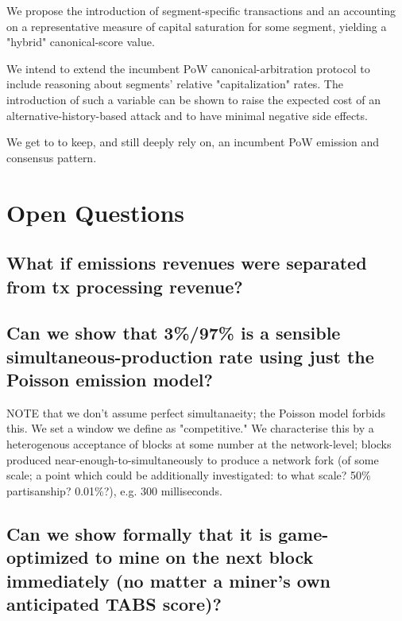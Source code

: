 \documentclass[11pt]{article}
\theoremstyle{plain}
\begin{document}
We propose the introduction of segment-specific transactions and an accounting
on a representative measure of capital saturation for some segment, yielding a
"hybrid" canonical-score value.

We intend to extend the incumbent PoW canonical-arbitration protocol to include
reasoning about segments' relative "capitalization" rates.
The introduction of such a variable can be shown to raise the expected cost of
an alternative-history-based attack and to have minimal negative side effects.

We get to to keep, and still deeply rely on, an incumbent PoW emission and
consensus pattern.





\section{\normalsize{Open Questions}}

\subsection{\small{What if emissions revenues were separated from tx processing
revenue?}}


\subsection{\small{Can we show that 3\%/97\% is a sensible
simultaneous-production rate using just the Poisson emission
model?}}

NOTE that we don't assume perfect simultanaeity; the Poisson model forbids this.
We set a window we define as "competitive." We characterise this by a
heterogenous acceptance of blocks at some number at the network-level; blocks
produced near-enough-to-simultaneously to produce a network fork (of some
scale; a point which could be additionally investigated: to what scale? 50\%
partisanship? 0.01\%?), e.g. 300 milliseconds.

\subsection{\small{Can we show formally that it is game-optimized to mine on
the next block immediately (no matter a miner's own anticipated TABS
score)?}}
\end{document}
